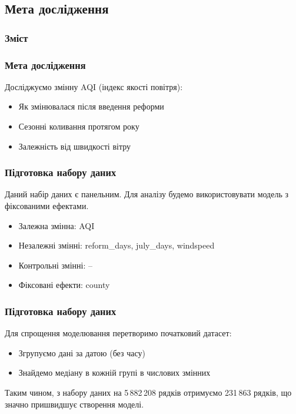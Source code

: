 \documentclass{beamer}
\begin{document}
% 

\begin{frame}
  \section{Мета дослідження}

  \frametitle{Зміст}
  \tableofcontents[currentsection]
\end{frame}

\begin{frame}
  \frametitle{Мета дослідження}
  Досліджуємо змінну AQI (індекс якості повітря):
  \begin{itemize}
    \item Як змінювалася після введення реформи
    \item Сезонні коливання протягом року
    \item Залежність від швидкості вітру
  \end{itemize}
\end{frame}

\begin{frame}
  \frametitle{Підготовка набору даних}

  Даний набір даних є панельним. Для аналізу будемо використовувати модель з фіксованими ефектами.

  \begin{itemize}
    \item Залежна змінна: AQI
    \item Незалежні змінні: reform\_days\footnotemark, july\_days\footnotemark, windspeed
    \item Контрольні змінні:  –
    \item Фіксовані ефекти: county
  \end{itemize}

\end{frame}

\begin{frame}
  \frametitle{Підготовка набору даних}

  Для спрощення моделювання перетворимо початковий датасет:
  
  \begin{itemize}
    \item Згрупуємо дані за датою (без часу)
    \item Знайдемо медіану в кожній групі в числових змінних
  \end{itemize}

  Таким чином, з набору даних на 5\,882\,208 рядків отримуємо 231\,863 рядків, що значно пришвидшує створення моделі.
\end{frame}
\end{document}
